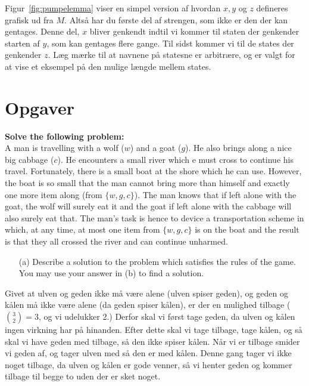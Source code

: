 Figur~\ref{fig:pumpelemma} viser en simpel version af hvordan $x, y$ og $z$ defineres grafisk ud fra $M$. Altså har du første del af strengen, som ikke er den der kan gentages. Denne del, $x$ bliver genkendt indtil vi kommer til staten der genkender starten af $y$, som kan gentages flere gange. Til sidst kommer vi til de states der genkender $z$. Læg mærke til at navnene på statesne er arbitrære, og er valgt for at vise et eksempel på den mulige længde mellem states.


\section{Opgaver}

\noindent
\textbf{Solve the following problem:} \\
\noindent
A man is travelling with a wolf ($w$) and a goat ($g$). He also brings along a nice big cabbage ($c$). He encounters a small river which e must cross to continue his travel. Fortunately, there is a small boat at the shore which he can use. However, the boat is so small that the man cannot bring more than himself and exactly one more item along (from $\{w, g, c\}$). The man knows that if left alone with the goat, the wolf will surely eat it and the goat if left alone with the cabbage will also surely eat that. The man's task is hence to device a transportation scheme in which, at any time, at most one item from $\{w,g,c\}$ is on the boat and the result is that they all crossed the river and can continue unharmed.

\begin{enumerate}
  \item[(a)] Describe a solution to the problem which satisfies the rules of the game. You may use your answer in (b) to find a solution.
\end{enumerate}

Givet at ulven og geden ikke må være alene (ulven spiser geden), og geden og kålen må ikke være alene (da geden spiser kålen), er der en mulighed tilbage ($\binom{3}{2} = 3$, og vi udelukker 2.) Derfor skal vi først tage geden, da ulven og kålen ingen virkning har på hinanden. Efter dette skal vi tage tilbage, tage kålen, og så skal vi have geden med tilbage, så den ikke spiser kålen. Når vi er tilbage smider vi geden af, og tager ulven med så den er med kålen. Denne gang tager vi ikke noget tilbage, da ulven og kålen er gode venner, så vi henter geden og kommer tilbage til begge to uden der er sket noget.

